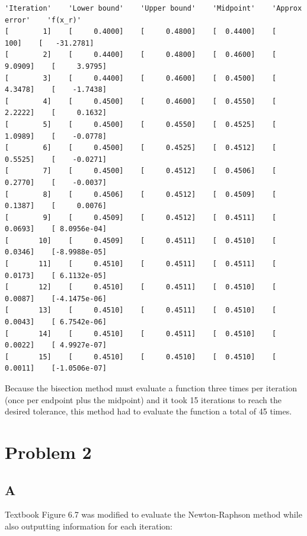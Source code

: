 \documentclass{article}
\begin{document}
\begin{lstlisting}
'Iteration'    'Lower bound'    'Upper bound'    'Midpoint'    'Approx error'    'f(x_r)'     
[        1]    [     0.4000]    [     0.4800]    [  0.4400]    [         100]    [   -31.2781]
[        2]    [     0.4400]    [     0.4800]    [  0.4600]    [      9.0909]    [     3.9795]
[        3]    [     0.4400]    [     0.4600]    [  0.4500]    [      4.3478]    [    -1.7438]
[        4]    [     0.4500]    [     0.4600]    [  0.4550]    [      2.2222]    [     0.1632]
[        5]    [     0.4500]    [     0.4550]    [  0.4525]    [      1.0989]    [    -0.0778]
[        6]    [     0.4500]    [     0.4525]    [  0.4512]    [      0.5525]    [    -0.0271]
[        7]    [     0.4500]    [     0.4512]    [  0.4506]    [      0.2770]    [    -0.0037]
[        8]    [     0.4506]    [     0.4512]    [  0.4509]    [      0.1387]    [     0.0076]
[        9]    [     0.4509]    [     0.4512]    [  0.4511]    [      0.0693]    [ 8.0956e-04]
[       10]    [     0.4509]    [     0.4511]    [  0.4510]    [      0.0346]    [-8.9988e-05]
[       11]    [     0.4510]    [     0.4511]    [  0.4511]    [      0.0173]    [ 6.1132e-05]
[       12]    [     0.4510]    [     0.4511]    [  0.4510]    [      0.0087]    [-4.1475e-06]
[       13]    [     0.4510]    [     0.4511]    [  0.4510]    [      0.0043]    [ 6.7542e-06]
[       14]    [     0.4510]    [     0.4511]    [  0.4510]    [      0.0022]    [ 4.9927e-07]
[       15]    [     0.4510]    [     0.4510]    [  0.4510]    [      0.0011]    [-1.0506e-07]
\end{lstlisting}

\hspace{20pt}

Because the bisection method must evaluate a function three times per iteration (once per endpoint plus the midpoint) and it took 15 iterations to reach the desired tolerance, this method had to evaluate the function a total of 45 times.


\section*{Problem 2}
\subsection*{A}

Textbook Figure 6.7 was modified to evaluate the Newton-Raphson method while also outputting information for each iteration:
\end{document}
